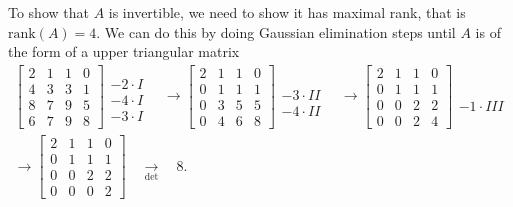 To show that $A$ is invertible, we need to show it has maximal rank, that
is $\text{rank}(A) = 4$. We can do this by doing Gaussian elimination
steps until $A$ is of the form of a upper triangular matrix
\begin{gather}
    \begin{bmatrix}
        2 & 1 & 1 & 0 \\
        4 & 3 & 3 & 1 \\
        8 & 7 & 9 & 5 \\
        6 & 7 & 9 & 8
    \end{bmatrix}
    \begin{matrix}
        \\
        -2 \cdot I\\
        -4 \cdot I\\
        -3 \cdot I
    \end{matrix} \quad
    \longrightarrow
    \begin{bmatrix}
        2 & 1 & 1 & 0 \\
        0 & 1 & 1 & 1 \\
        0 & 3 & 5 & 5 \\
        0 & 4 & 6 & 8
    \end{bmatrix}
    \begin{matrix}
        \\
        \\
        -3 \cdot II\\
        -4 \cdot II
    \end{matrix} \quad
    \longrightarrow
    \begin{bmatrix}
        2 & 1 & 1 & 0 \\
        0 & 1 & 1 & 1 \\
        0 & 0 & 2 & 2 \\
        0 & 0 & 2 & 4
    \end{bmatrix}
    \begin{matrix}
        \\
        \\
        \\
        -1 \cdot III
    \end{matrix} \quad
    \label{eq: gelim1}
    \\
    \longrightarrow
    \begin{bmatrix}
        2 & 1 & 1 & 0 \\
        0 & 1 & 1 & 1 \\
        0 & 0 & 2 & 2 \\
        0 & 0 & 0 & 2
    \end{bmatrix} \quad
    \underset{\text{det}}{\longrightarrow} \quad 8
    \label{eq: gelim2}
.\end{gather}

